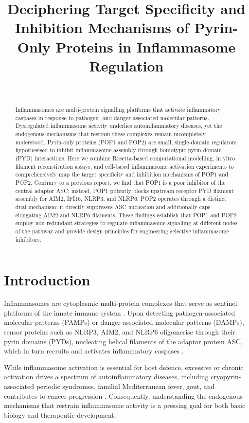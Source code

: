 \documentclass[12pt]{article}
\title{Deciphering Target Specificity and Inhibition Mechanisms of Pyrin-Only Proteins in Inflammasome Regulation}
\author{~}
\date{}
\begin{document}
\maketitle

\begin{abstract}
Inflammasomes are multi-protein signalling platforms that activate inflammatory caspases in response to pathogen- and danger-associated molecular patterns. Dysregulated inflammasome activity underlies autoinflammatory diseases, yet the endogenous mechanisms that restrain these complexes remain incompletely understood. Pyrin-only proteins (POP1 and POP2) are small, single-domain regulators hypothesised to inhibit inflammasome assembly through homotypic pyrin domain (PYD) interactions. Here we combine Rosetta-based computational modelling, in vitro filament reconstitution assays, and cell-based inflammasome activation experiments to comprehensively map the target specificity and inhibition mechanisms of POP1 and POP2. Contrary to a previous report, we find that POP1 is a poor inhibitor of the central adaptor ASC; instead, POP1 potently blocks upstream receptor PYD filament assembly for AIM2, IFI16, NLRP3, and NLRP6. POP2 operates through a distinct dual mechanism: it directly suppresses ASC nucleation and additionally caps elongating AIM2 and NLRP6 filaments. These findings establish that POP1 and POP2 employ non-redundant strategies to regulate inflammasome signalling at different nodes of the pathway and provide design principles for engineering selective inflammasome inhibitors.
\end{abstract}

\section{Introduction}

Inflammasomes are cytoplasmic multi-protein complexes that serve as sentinel platforms of the innate immune system \citep{martinon2002inflammasome}. Upon detecting pathogen-associated molecular patterns (PAMPs) or danger-associated molecular patterns (DAMPs), sensor proteins such as NLRP3, AIM2, and NLRP6 oligomerise through their pyrin domains (PYDs), nucleating helical filaments of the adaptor protein ASC, which in turn recruits and activates inflammatory caspases \citep{lu2014unified, broz2016inflammasomes}.

While inflammasome activation is essential for host defence, excessive or chronic activation drives a spectrum of autoinflammatory diseases, including cryopyrin-associated periodic syndromes, familial Mediterranean fever, gout, and contributes to cancer progression \citep{masters2009horror, karki2017diverging}. Consequently, understanding the endogenous mechanisms that restrain inflammasome activity is a pressing goal for both basic biology and therapeutic development.
\end{document}
